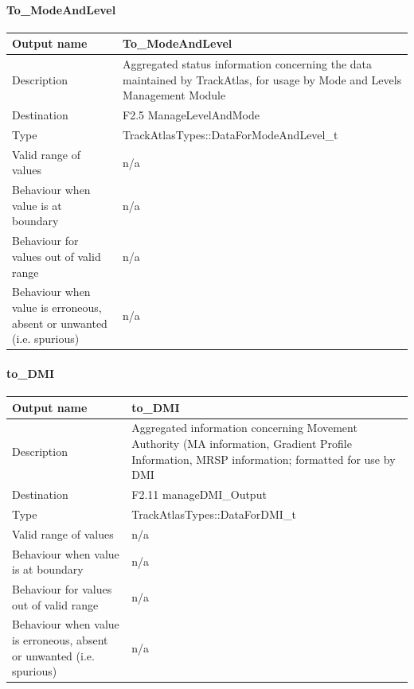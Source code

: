 \paragraph{To\_ModeAndLevel}

\begin{longtable}{p{}p{}}
\toprule
Output name				& To\_ModeAndLevel \\
\midrule
Description				& Aggregated status information concerning the data maintained by TrackAtlas, for usage by Mode and Levels Management Module \\
\midrule
Destination				& F2.5 ManageLevelAndMode \\ 
\midrule
Type					& TrackAtlasTypes::DataForModeAndLevel\_t\\
\midrule
Valid range of values	& n/a \\
\midrule
Behaviour when value is at boundary	& n/a  \\
\midrule
Behaviour for values out of valid range	& n/a  \\
\midrule
Behaviour when value is erroneous, absent or unwanted (i.e. spurious) & n/a  \\
\bottomrule
\end{longtable}

\paragraph{to\_DMI}

\begin{longtable}{p{}p{}}
\toprule
Output name				& to\_DMI \\
\midrule
Description				& Aggregated information concerning Movement Authority (MA information, Gradient Profile Information, MRSP information; formatted for use by DMI \\
\midrule
Destination				& F2.11 manageDMI\_Output  \\ 
\midrule
Type					& TrackAtlasTypes::DataForDMI\_t\\
\midrule
Valid range of values	& n/a \\
\midrule
Behaviour when value is at boundary	& n/a  \\
\midrule
Behaviour for values out of valid range	& n/a  \\
\midrule
Behaviour when value is erroneous, absent or unwanted (i.e. spurious) & n/a  \\
\bottomrule
\end{longtable}

